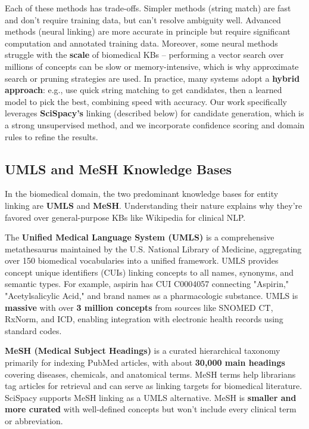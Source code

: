 Each of these methods has trade-offs. Simpler methods (string match) are fast and don't require training data, but can't resolve ambiguity well. Advanced methods (neural linking) are more accurate in principle but require significant computation and annotated training data. Moreover, some neural methods struggle with the \textbf{scale} of biomedical KBs – performing a vector search over millions of concepts can be slow or memory-intensive, which is why approximate search or pruning strategies are used. In practice, many systems adopt a \textbf{hybrid approach}: e.g., use quick string matching to get candidates, then a learned model to pick the best, combining speed with accuracy. Our work specifically leverages \textbf{SciSpacy's} linking (described below) for candidate generation, which is a strong unsupervised method, and we incorporate confidence scoring and domain rules to refine the results.

\subsection{UMLS and MeSH Knowledge Bases}

In the biomedical domain, the two predominant knowledge bases for entity linking are \textbf{UMLS} and \textbf{MeSH}. Understanding their nature explains why they're favored over general-purpose KBs like Wikipedia for clinical NLP.

The \textbf{Unified Medical Language System (UMLS)} is a comprehensive metathesaurus maintained by the U.S. National Library of Medicine, aggregating over 150 biomedical vocabularies into a unified framework. UMLS provides concept unique identifiers (CUIs) linking concepts to all names, synonyms, and semantic types. For example, aspirin has CUI C0004057 connecting "Aspirin," "Acetylsalicylic Acid," and brand names as a pharmacologic substance. UMLS is \textbf{massive} with over \textbf{3 million concepts} from sources like SNOMED CT, RxNorm, and ICD, enabling integration with electronic health records using standard codes.

\textbf{MeSH (Medical Subject Headings)} is a curated hierarchical taxonomy primarily for indexing PubMed articles, with about \textbf{30,000 main headings} covering diseases, chemicals, and anatomical terms. MeSH terms help librarians tag articles for retrieval and can serve as linking targets for biomedical literature. SciSpacy supports MeSH linking as a UMLS alternative. MeSH is \textbf{smaller and more curated} with well-defined concepts but won't include every clinical term or abbreviation.

